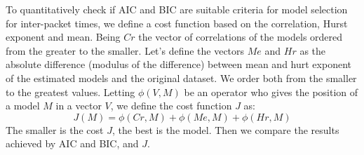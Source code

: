 To quantitatively check if AIC and BIC are suitable criteria for model selection for inter-packet times, we define a cost function based on the correlation, Hurst exponent and mean. Being $Cr$ the vector of correlations of the models ordered from the greater to the smaller. Let's define the vectors $Me$ and $Hr$ as the absolute difference (modulus of the difference) between mean and hurt exponent of the estimated models and the original dataset.  We order both from the smaller to the greatest values. Letting $\phi(V, M)$ be an operator who gives the position of a model $M$ in a vector $V$, we define the cost function $J$ as:
\begin{equation}
J(M) = \phi(Cr, M) + \phi(Me, M) + \phi(Hr, M)
\end{equation}
The smaller is the cost $J$, the best is the model. Then we compare the results achieved by AIC and BIC, and $J$.


